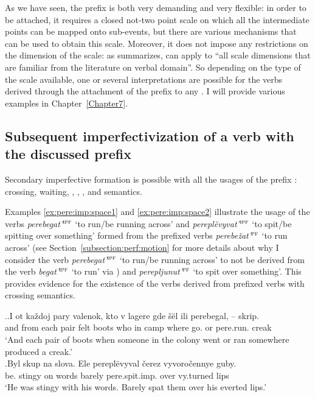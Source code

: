As we have seen, the prefix  is both very demanding and very flexible: in order to be attached, it requires a closed not-two point scale on which all the intermediate points can be mapped onto sub-events, but there are various mechanisms that can be used to obtain this scale. Moreover, it does not impose any restrictions on the dimension of the scale: as \citet[151]{Kagan:book} summarizes,  can apply to ``all scale dimensions that are familiar from the literature on verbal domain''. So depending on the type of the scale available, one or several interpretations are possible for the verbs derived through the attachment of the prefix  to any . I will provide various examples in Chapter~\ref{Chapter7}.

\subsection{Subsequent imperfectivization of a verb with the discussed prefix}
Secondary imperfective formation is possible with all the usages of the prefix : crossing, waiting, , , , and  semantics.

Examples \ref{ex:pere:imp:space1} and \ref{ex:pere:imp:space2} illustrate the usage of the  verbs \textit{perebegat'}$^{\textsc{ipf}}$ `to run/be running across' and \textit{perepl\"{e}vyvat'}$^{\textsc{ipf}}$ `to spit/be spitting over something' formed from the prefixed verbs \textit{perebe\v{z}at'}$^{\textsc{pf}}$ `to run across' (see Section~\ref{subsection:perf:motion} for more details about why I consider the verb \textit{pe\-re\-be\-gat'}$^{\textsc{ipf}}$ `to run/be running across' to not be derived from the verb \textit{begat'}$^{\textsc{ipf}}$ `to run' via ) and \textit{perepljunut'}$^{\textsc{pf}}$ `to spit over something'. This provides evidence for the existence of the  verbs derived from prefixed verbs with crossing semantics.

\ex.\ag.\label{ex:pere:imp:space1}I ot ka\v{z}doj pary valenok, kto v lagere gde \v{s}\"{e}l ili perebegal, -- skrip.\\
and from each pair {felt boots} who in camp where go. or pere.run. {} creak\\
\trans `And each pair of boots when someone in the colony went or ran somewhere produced a creak.'\\
\bg.\label{ex:pere:imp:space2}Byl skup na slova. Ele perepl\"{e}vyval \v{c}erez vyvoro\v{c}ennye guby.\\
be. stingy on words barely pere.spit.imp. over vy.turned lips\\
\trans `He was stingy with his words. Barely spat them over his everted lips.'\\


